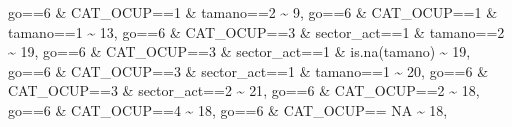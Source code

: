\documentclass[
]{book}
\newenvironment{Shaded}{\begin{snugshade}}{\end{snugshade}}
\newcommand{\ConstantTok}[1]{\textcolor[rgb]{0.00,0.00,0.00}{#1}}
\newcommand{\DecValTok}[1]{\textcolor[rgb]{0.00,0.00,0.81}{#1}}
\newcommand{\FunctionTok}[1]{\textcolor[rgb]{0.00,0.00,0.00}{#1}}
\newcommand{\NormalTok}[1]{#1}
\newcommand{\SpecialCharTok}[1]{\textcolor[rgb]{0.00,0.00,0.00}{#1}}
\begin{document}
\begin{Shaded}
\begin{Highlighting}[]
\NormalTok{                               go}\SpecialCharTok{==}\DecValTok{6} \SpecialCharTok{\&}\NormalTok{ CAT\_OCUP}\SpecialCharTok{==}\DecValTok{1} \SpecialCharTok{\&}\NormalTok{ tamano}\SpecialCharTok{==}\DecValTok{2}  \SpecialCharTok{\textasciitilde{}} \DecValTok{9}\NormalTok{,}
\NormalTok{                               go}\SpecialCharTok{==}\DecValTok{6} \SpecialCharTok{\&}\NormalTok{ CAT\_OCUP}\SpecialCharTok{==}\DecValTok{1} \SpecialCharTok{\&}\NormalTok{ tamano}\SpecialCharTok{==}\DecValTok{1}  \SpecialCharTok{\textasciitilde{}} \DecValTok{13}\NormalTok{,}
\NormalTok{                               go}\SpecialCharTok{==}\DecValTok{6} \SpecialCharTok{\&}\NormalTok{ CAT\_OCUP}\SpecialCharTok{==}\DecValTok{3} \SpecialCharTok{\&}\NormalTok{ sector\_act}\SpecialCharTok{==}\DecValTok{1} \SpecialCharTok{\&}\NormalTok{ tamano}\SpecialCharTok{==}\DecValTok{2} \SpecialCharTok{\textasciitilde{}} \DecValTok{19}\NormalTok{,}
\NormalTok{                               go}\SpecialCharTok{==}\DecValTok{6} \SpecialCharTok{\&}\NormalTok{ CAT\_OCUP}\SpecialCharTok{==}\DecValTok{3} \SpecialCharTok{\&}\NormalTok{ sector\_act}\SpecialCharTok{==}\DecValTok{1} \SpecialCharTok{\&} \FunctionTok{is.na}\NormalTok{(tamano)  }\SpecialCharTok{\textasciitilde{}} \DecValTok{19}\NormalTok{,}
\NormalTok{                               go}\SpecialCharTok{==}\DecValTok{6} \SpecialCharTok{\&}\NormalTok{ CAT\_OCUP}\SpecialCharTok{==}\DecValTok{3} \SpecialCharTok{\&}\NormalTok{ sector\_act}\SpecialCharTok{==}\DecValTok{1} \SpecialCharTok{\&}\NormalTok{ tamano}\SpecialCharTok{==}\DecValTok{1} \SpecialCharTok{\textasciitilde{}} \DecValTok{20}\NormalTok{,}
\NormalTok{                               go}\SpecialCharTok{==}\DecValTok{6} \SpecialCharTok{\&}\NormalTok{ CAT\_OCUP}\SpecialCharTok{==}\DecValTok{3} \SpecialCharTok{\&}\NormalTok{ sector\_act}\SpecialCharTok{==}\DecValTok{2} \SpecialCharTok{\textasciitilde{}} \DecValTok{21}\NormalTok{,}
\NormalTok{                               go}\SpecialCharTok{==}\DecValTok{6} \SpecialCharTok{\&}\NormalTok{ CAT\_OCUP}\SpecialCharTok{==}\DecValTok{2}  \SpecialCharTok{\textasciitilde{}} \DecValTok{18}\NormalTok{,}
\NormalTok{                               go}\SpecialCharTok{==}\DecValTok{6} \SpecialCharTok{\&}\NormalTok{ CAT\_OCUP}\SpecialCharTok{==}\DecValTok{4}  \SpecialCharTok{\textasciitilde{}} \DecValTok{18}\NormalTok{,}
\NormalTok{                               go}\SpecialCharTok{==}\DecValTok{6} \SpecialCharTok{\&}\NormalTok{ CAT\_OCUP}\SpecialCharTok{==} \ConstantTok{NA}    \SpecialCharTok{\textasciitilde{}} \DecValTok{18}\NormalTok{,}
         

\end{Highlighting}
\end{Shaded}
\end{document}
